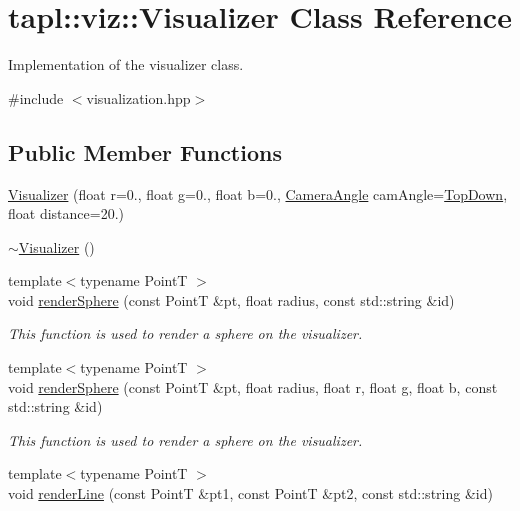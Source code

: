 \hypertarget{classtapl_1_1viz_1_1Visualizer}{}\section{tapl\+:\+:viz\+:\+:Visualizer Class Reference}
\label{classtapl_1_1viz_1_1Visualizer}


Implementation of the visualizer class.  




{\ttfamily \#include $<$visualization.\+hpp$>$}

\subsection*{Public Member Functions}
\begin{DoxyCompactItemize}
\item 
\hyperlink{classtapl_1_1viz_1_1Visualizer_a56215eefb4712acf78a922485d844f50}{Visualizer} (float r=0., float g=0., float b=0., \hyperlink{namespacetapl_1_1viz_a99e496921984514dbc7bcef809f50150}{Camera\+Angle} cam\+Angle=\hyperlink{namespacetapl_1_1viz_a99e496921984514dbc7bcef809f50150a9aa35eea1fe8f4b45a0b02a8b5048cfa}{Top\+Down}, float distance=20.)
\item 
\hyperlink{classtapl_1_1viz_1_1Visualizer_a47473d1bffdf617379d718f1c2ed5930}{$\sim$\+Visualizer} ()
\item 
{\footnotesize template$<$typename PointT $>$ }\\void \hyperlink{classtapl_1_1viz_1_1Visualizer_a1ffe49d8e3b2693b0c0a4ccd10edac9d}{render\+Sphere} (const PointT \&pt, float radius, const std\+::string \&id)
\begin{DoxyCompactList}\small\item\em This function is used to render a sphere on the visualizer. \end{DoxyCompactList}\item 
{\footnotesize template$<$typename PointT $>$ }\\void \hyperlink{classtapl_1_1viz_1_1Visualizer_acca33adaa4aeaeca6f393dee319b36b8}{render\+Sphere} (const PointT \&pt, float radius, float r, float g, float b, const std\+::string \&id)
\begin{DoxyCompactList}\small\item\em This function is used to render a sphere on the visualizer. \end{DoxyCompactList}\item 
{\footnotesize template$<$typename PointT $>$ }\\void \hyperlink{classtapl_1_1viz_1_1Visualizer_a44e1d90914fa8129f4e4a26b4ad67718}{render\+Line} (const PointT \&pt1, const PointT \&pt2, const std\+::string \&id)

\end{DoxyCompactItemize}
